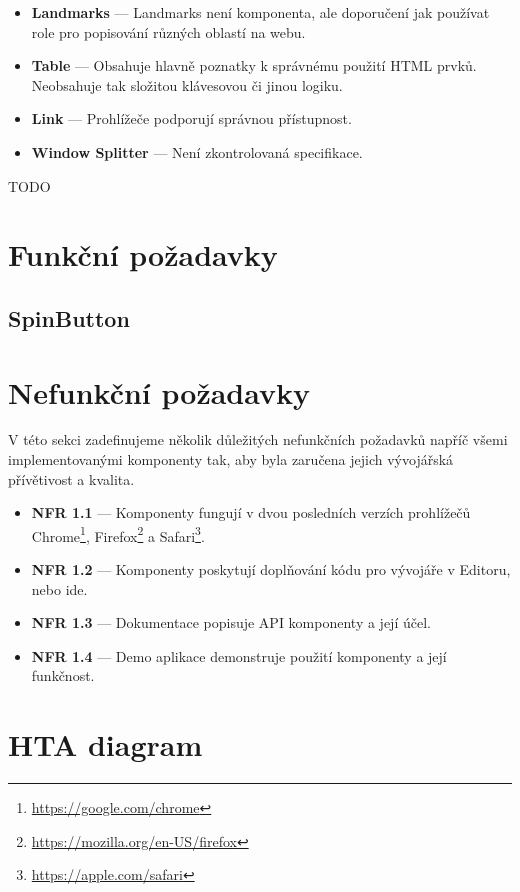 \begin{itemize}
    \item \textbf{Landmarks} --- Landmarks není komponenta, ale doporučení jak používat role pro popisování různých oblastí na webu.
    \item \textbf{Table} --- Obsahuje hlavně poznatky k správnému použití HTML prvků. Neobsahuje tak složitou klávesovou či jinou logiku.
    \item \textbf{Link} --- Prohlížeče podporují správnou přístupnost.
    \item \textbf{Window Splitter} --- Není zkontrolovaná specifikace.
\end{itemize}

TODO

\section{Funkční požadavky}



\subsection{SpinButton}

\section{Nefunkční požadavky}

V této sekci zadefinujeme několik důležitých nefunkčních požadavků napříč všemi implementovanými komponenty tak, aby byla zaručena jejich vývojářská přívětivost a kvalita.

\begin{itemize}
    \item \textbf{NFR 1.1} --- Komponenty fungují v dvou posledních verzích prohlížečů Chrome\footnote{\url{https://google.com/chrome}}, Firefox\footnote{\url{https://mozilla.org/en-US/firefox}} a Safari\footnote{\url{https://apple.com/safari}}.
    \item \textbf{NFR 1.2} --- Komponenty poskytují doplňování kódu pro vývojáře v Editoru, nebo \gls{ide}.
    \item \textbf{NFR 1.3} --- Dokumentace popisuje API komponenty a její účel.
    \item \textbf{NFR 1.4} --- Demo aplikace demonstruje použití komponenty a její funkčnost.
\end{itemize}

\section{HTA diagram}


